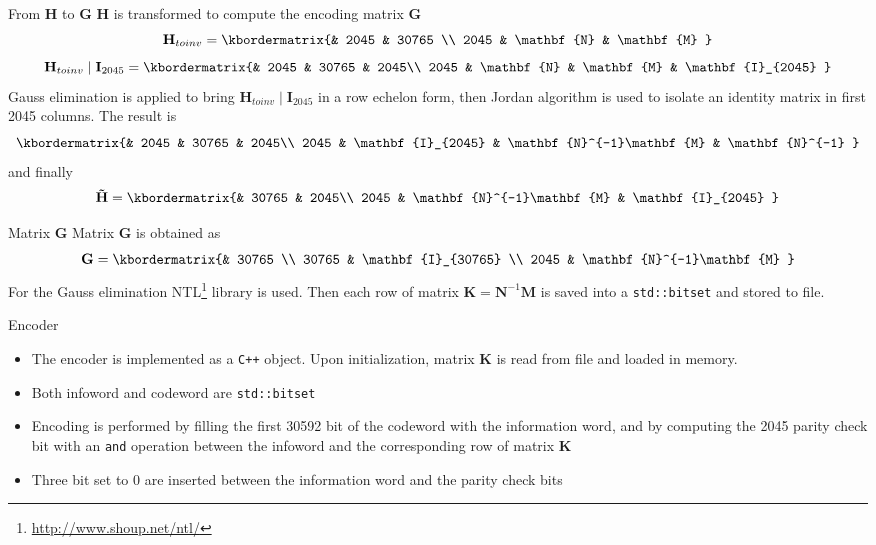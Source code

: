 \documentclass[pdf]
          {beamer}
\begin{document}
\begin{frame}{From $\mathbf{H}$ to $\mathbf{G}$}
	$\mathbf{H}$ is transformed to compute the encoding matrix $\mathbf{G}$
	\begin{equation*}
		\mathbf{H}_{to inv} = 
			\kbordermatrix{%
					 & 2045 	  & 30765 \\
				2045 & \mathbf{N} & \mathbf{M}
			}
	\end{equation*}
	\begin{equation*}
		\mathbf{H}_{to inv} \; | \; \mathbf{I}_{2045} = 
			\kbordermatrix{%
					 & 2045 	  & 30765  & 2045\\
				2045 & \mathbf{N} & \mathbf{M} & \mathbf{I}_{2045}
			}
	\end{equation*}
	\small{Gauss elimination is applied to bring $\mathbf{H}_{toinv} \; | \; \mathbf{I}_{2045}$ in a row echelon form, then Jordan algorithm is used to isolate an identity matrix in first 2045 columns. The result is}
	\begin{equation*}
			\kbordermatrix{%
					 & 2045 	  & 30765  & 2045\\
				2045 & \mathbf{I}_{2045} & \mathbf{N}^{-1}\mathbf{M} & \mathbf{N}^{-1}
			}
	\end{equation*}
	\small{and finally}
	\begin{equation*}
			\mathbf{\tilde{H}} = 
			\kbordermatrix{%
					 & 30765  & 2045\\
				2045 & \mathbf{N}^{-1}\mathbf{M} & \mathbf{I}_{2045} 
			}
	\end{equation*}
\end{frame}
\renewcommand{\arraystretch}{1.5}
\begin{frame}{Matrix $\mathbf{G}$}
	Matrix $\mathbf{G}$ is obtained as 
	\begin{equation*}
			\mathbf{G} = 
			\kbordermatrix{%
					 & 30765 \\
				30765 & \mathbf{I}_{30765} \\ 
				2045 &  \mathbf{N}^{-1}\mathbf{M}  
			}
	\end{equation*}
	For the Gauss elimination NTL\footnote{\url{http://www.shoup.net/ntl/}} library is used. Then each row of matrix $\mathbf{K} = \mathbf{N}^{-1}\mathbf{M}$ is saved into a \texttt{std::bitset} and stored to file. 
\end{frame}

\begin{frame}{Encoder}
\begin{itemize}
	\item The encoder is implemented as a \texttt{C++} object. Upon initialization, matrix $\mathbf{K}$ is read from file and loaded in memory. 
	\item Both infoword and codeword are \texttt{std::bitset}
	\item Encoding is performed by filling the first 30592 bit of the codeword with the information word, and by computing the 2045 parity check bit with an \texttt{and} operation between the infoword and the corresponding row of matrix $\mathbf{K}$
	\item Three bit set to 0 are inserted between the information word and the parity check bits
\end{itemize}
\end{frame}
\end{document}
